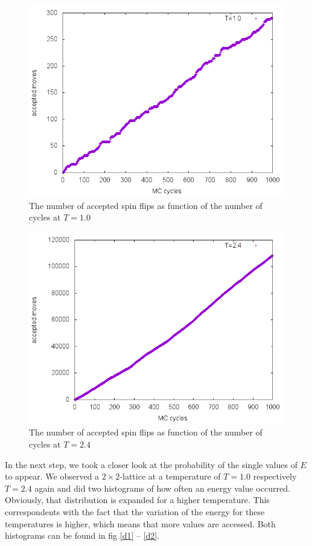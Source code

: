 \documentclass[10pt,a4paper]{article}
\begin{document}
\begin{figure}[h]
	\includegraphics[width=\textwidth]{b1.png}
	\caption{The number of accepted spin flips as function of the number of cycles at $T=1.0$\label{c_5}}
\end{figure}
\begin{figure}[h]
	\includegraphics[width=\textwidth]{b24.png}
	\caption{The number of accepted spin flips as function of the number of cycles at $T=2.4$\label{c_6}}
\end{figure}

In the next step, we took a closer look at the probability of the single values of $E$ to appear. We observed a $2\times2$-lattice at a temperature of $T=1.0$ respectively $T=2.4$ again and did two histograms of how often an energy value occurred. Obviously, that distribution is expanded for a higher temperature. This correspondents with the fact that the variation of the energy for these temperatures is higher, which means that more values are accessed. Both histograms can be found in fig \ref{d1} -- \ref{d2}.
\end{document}
